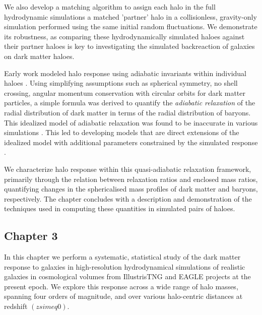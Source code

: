 \documentclass[a4paper, 12pt, oneside]{Thesis}  %
\begin{document}
We also develop a matching algorithm to assign each halo in the full hydrodynamic simulations a matched 'partner' halo in a collisionless, gravity-only simulation performed using the same initial random fluctuations. We demonstrate its robustness, as comparing these hydrodynamically simulated haloes against their partner haloes is key to investigating the simulated backreaction of galaxies on dark matter haloes.

Early work modeled halo response using adiabatic invariants within individual haloes \citep[][]{osti6457593,1984MNRAS.211..753B,1986ApJ...301...27B,1987ApJ...318...15R}. Using simplifying assumptions such as spherical symmetry, no shell crossing, angular momentum conservation with circular orbits for dark matter particles, a simple formula was derived to quantify the \emph{adiabatic relaxation} of the radial distribution of dark matter in terms of the radial distribution of baryons. This idealized model of adiabatic relaxation \citep[][]{1986ApJ...301...27B} was found to be inaccurate in various simulations \citep[see, e.g.,][]{2004ApJ...616...16G,2006PhRvD..74l3522G,2010MNRAS.402..776P,2010MNRAS.406..922T,2010MNRAS.405.2161D,2010MNRAS.407..435A,2011MNRAS.414..195T,2016MNRAS.461.2658D,2019A&A...622A.197A,2022MNRAS.511.3910F}. This led to developing models that are direct extensions of the idealized model with additional parameters constrained by the simulated response \citep{2010MNRAS.407..435A,2004ApJ...616...16G,2006PhRvD..74l3522G,2010MNRAS.405.2161D}.

We characterize halo response within this quasi-adiabatic relaxation framework, primarily through the relation between relaxation ratios and enclosed mass ratios, quantifying changes in the sphericalised mass profiles of dark matter and baryons, respectively. The chapter concludes with a description and demonstration of the techniques used in computing these quantities in simulated pairs of haloes.



\subsection*{Chapter 3}

In this chapter we perform a systematic, statistical study of the dark matter response to galaxies in high-resolution hydrodynamical simulations of realistic galaxies in cosmological volumes from IllustrisTNG and EAGLE projects at the present epoch.
% 
% 
% 
% 
We explore this response across a wide range of halo masses, spanning four orders of magnitude, and over various halo-centric distances at redshift $(z simeq 0)$.
\end{document}
